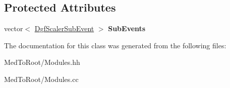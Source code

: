 \subsection*{Protected Attributes}
\begin{DoxyCompactItemize}
\item 
\hypertarget{class_dgf_scaler_a867e6953afa484ee4b7ca8ec204a1fa1}{vector$<$ \hyperlink{class_dgf_scaler_sub_event}{Dgf\-Scaler\-Sub\-Event} $>$ {\bfseries Sub\-Events}}\label{class_dgf_scaler_a867e6953afa484ee4b7ca8ec204a1fa1}

\end{DoxyCompactItemize}


The documentation for this class was generated from the following files\-:\begin{DoxyCompactItemize}
\item 
Med\-To\-Root/Modules.\-hh\item 
Med\-To\-Root/Modules.\-cc\end{DoxyCompactItemize}
